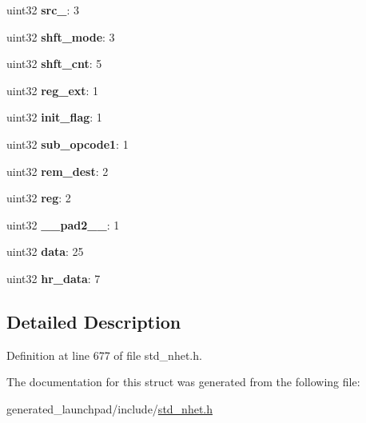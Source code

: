 \begin{DoxyCompactItemize}
uint32 {\bfseries src\+\_}\+: 3
\item 
\mbox{\label{structOR__format_a95f2efaf42a9e0cd14b7658d67c23ced}} 
uint32 {\bfseries shft\+\_\+mode}\+: 3
\item 
\mbox{\label{structOR__format_a8eb3d28765b304d66207c4bd0dae6d2b}} 
uint32 {\bfseries shft\+\_\+cnt}\+: 5
\item 
\mbox{\label{structOR__format_af1e5f1621e55fcec37a72565cc318d00}} 
uint32 {\bfseries reg\+\_\+ext}\+: 1
\item 
\mbox{\label{structOR__format_a2cc6447a26f1c8bd1952664772024120}} 
uint32 {\bfseries init\+\_\+flag}\+: 1
\item 
\mbox{\label{structOR__format_a079da0b496827b805054a2c04cd87307}} 
uint32 {\bfseries sub\+\_\+opcode1}\+: 1
\item 
\mbox{\label{structOR__format_ac606dccefcf5ea859eb59567a2165c00}} 
uint32 {\bfseries rem\+\_\+dest}\+: 2
\item 
\mbox{\label{structOR__format_aec3df4c2f6111c7a2e7983822fa21825}} 
uint32 {\bfseries reg}\+: 2
\item 
\mbox{\label{structOR__format_a140f03b45576115cf5f2929d806f7679}} 
uint32 {\bfseries \+\_\+\+\_\+pad2\+\_\+\+\_\+}\+: 1
\item 
\mbox{\label{structOR__format_aac7a98dea2523b0875dac22980ef6a7d}} 
uint32 {\bfseries data}\+: 25
\item 
\mbox{\label{structOR__format_a637f2c7a904db2eabe9d9180b0d2e819}} 
uint32 {\bfseries hr\+\_\+data}\+: 7
\end{DoxyCompactItemize}


\subsection{Detailed Description}


Definition at line 677 of file std\+\_\+nhet.\+h.



The documentation for this struct was generated from the following file\+:\begin{DoxyCompactItemize}
\item 
generated\+\_\+launchpad/include/\mbox{\hyperlink{std__nhet_8h}{std\+\_\+nhet.\+h}}\end{DoxyCompactItemize}
